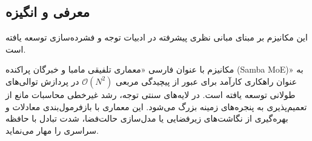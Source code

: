\subsection{معرفی و انگیزه}
این مکانیزم بر مبنای مبانی نظری پیشرفته در ادبیات توجه و فشرده‌سازی \cite{ren2024samba} توسعه یافته است.

مکانیزم  با عنوان فارسی «معماری تلفیقی مامبا و خبرگان پراکنده (Samba MoE)» به عنوان راهکاری کارآمد برای عبور از پیچیدگی مربعی $\mathcal{O}(N^2)$ در پردازش توالی‌های طولانی توسعه یافته است. در لایه‌های سنتی توجه، رشد غیرخطی محاسبات مانع از تعمیم‌پذیری به پنجره‌های زمینه بزرگ می‌شود. این معماری با بازفرمول‌بندی معادلات و بهره‌گیری از نگاشت‌های زیرفضایی یا مدل‌سازی حالت‌فضا، شدت تبادل با حافظه سراسری را مهار می‌نماید.
